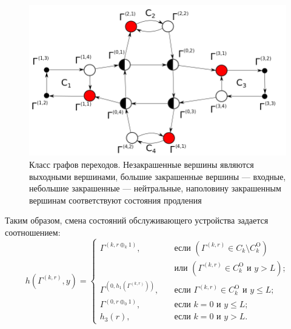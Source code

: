 \begin{figure}[h]\centering
\includegraphics[scale=0.5]{Pictures/GraphScheme3.png} 
\caption{Класс графов переходов. Незакрашенные вершины являются выходными вершинами,  большие закрашенные вершины --- входные,  небольшие закрашенные --- нейтральные,  наполовину закрашенным вершинам соответствуют состояния продления}
\label{GraphScheme}
\end{figure}

Таким образом,  смена состояний обслуживающего устройства задается соотношением:
\begin{equation}
h(\Gamma^{(k, r)}, y) = 
\begin{cases}
\Gamma^{(k, r \oplus_k 1)}, & \quad \text{если } (\Gamma^{(k, r)}\in C_k\setminus C_k^{\mathrm{O}}) \\
& \quad \text{или } (\Gamma^{(k, r)}\in C_k^{\mathrm{O}} \text{ и } y>L);\\
\Gamma^{(0, h_1(\Gamma^{(k, r)}))}, & \quad \text{если } \Gamma^{(k, r)}\in C_k^{\mathrm{O}} \text{ и } y\leqslant L;\\
\Gamma^{(0, r \oplus_0 1)}, & \quad \text{если } k=0 \text{ и } y\leqslant L;\\
h_3(r), & \quad \text{если } k=0 \text{ и } y > L.
\end{cases}
\label{hLaw}
\end{equation}

